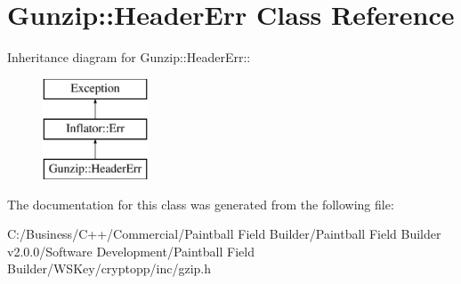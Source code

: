 \hypertarget{class_gunzip_1_1_header_err}{
\section{Gunzip::HeaderErr Class Reference}
\label{class_gunzip_1_1_header_err}
}
Inheritance diagram for Gunzip::HeaderErr::\begin{figure}[H]
\begin{center}
\leavevmode
\includegraphics[height=3cm]{class_gunzip_1_1_header_err}
\end{center}
\end{figure}


The documentation for this class was generated from the following file:\begin{DoxyCompactItemize}
\item 
C:/Business/C++/Commercial/Paintball Field Builder/Paintball Field Builder v2.0.0/Software Development/Paintball Field Builder/WSKey/cryptopp/inc/gzip.h\end{DoxyCompactItemize}
